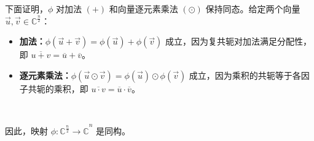 下面证明，$\phi$ 对加法 $(+)$ 和向量逐元素乘法 $(\odot)$ 保持同态。给定两个向量 $\vec{u}, \vec{v} \in \mathbb{C}^{\frac{n}{2}}$：
\begin{itemize}
    \item \textbf{加法：}$\phi(\vec{u} + \vec{v}) = \phi(\vec{u}) + \phi(\vec{v})$ 成立，因为复共轭对加法满足分配性，即 $\overline{u + v} = \overline{u} + \overline{v}$。
    \item \textbf{逐元素乘法：}$\phi(\vec{u} \odot \vec{v}) = \phi(\vec{u}) \odot \phi(\vec{v})$ 成立，因为乘积的共轭等于各因子共轭的乘积，即 $\overline{u \cdot v} = \overline{u} \cdot \overline{v}$。
\end{itemize}

$ $

因此，映射 $\phi: \mathbb{C}^{\frac{n}{2}} \rightarrow \hat{\mathbb{C}}^{n}$ 是同构。

